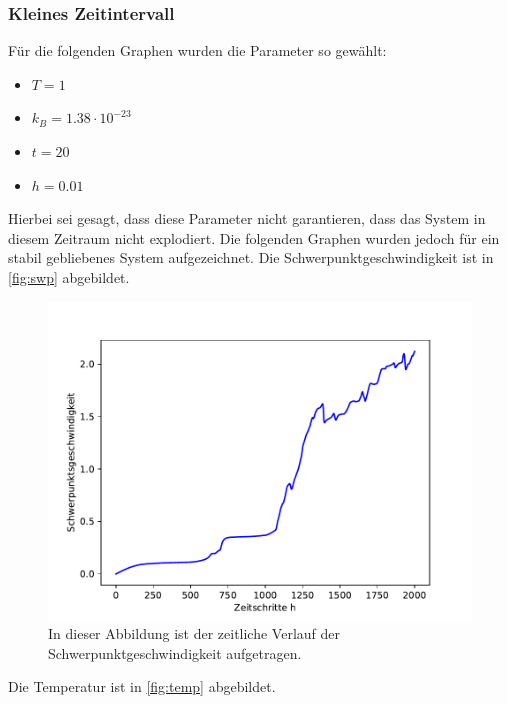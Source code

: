 \subsubsection{Kleines Zeitintervall}
Für die folgenden Graphen wurden die Parameter so gewählt:
\begin{itemize}
    \item $T = 1$
    \item $k_B = 1.38\cdot10^{-23}$
    \item $t = 20$
    \item $h = 0.01$
\end{itemize}
Hierbei sei gesagt, dass diese Parameter nicht garantieren, dass das System in diesem Zeitraum nicht explodiert.
Die folgenden Graphen wurden jedoch für ein stabil gebliebenes System aufgezeichnet.
\newpage
Die Schwerpunktgeschwindigkeit ist in \autoref{fig:swp} abgebildet.
\begin{figure}[H]
    \centering
    \includegraphics[scale=0.5]{MolDyn/Small Boy/swp_velocity.pdf}
    \caption{In dieser Abbildung ist der zeitliche Verlauf der Schwerpunktgeschwindigkeit aufgetragen.}
    \label{fig:swp}
\end{figure}
Die Temperatur ist in \autoref{fig:temp} abgebildet.

